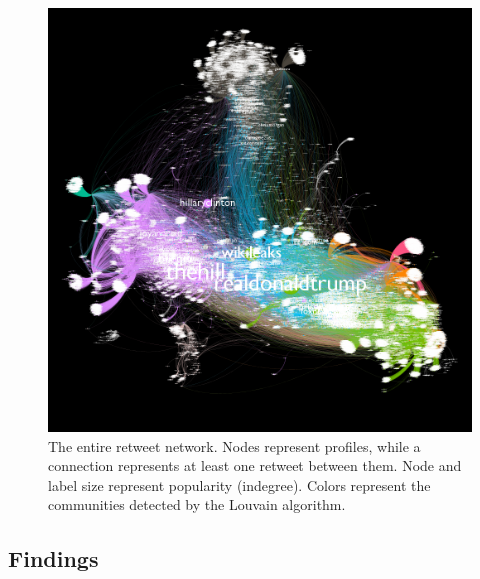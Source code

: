 \documentclass[12pt, titlepage=true, toc=bib]{scrartcl}
\begin{document}
\begin{figure}[!ht]
\centering
\includegraphics[width=0.95\linewidth]{Network_modularity.png}
\caption[Retweet network]{The entire retweet network. Nodes represent profiles, while a connection represents at least one retweet between them. Node and label size represent popularity (indegree). Colors represent the communities detected by the Louvain algorithm.}
\label{fig:graph}
\end{figure}


\subsection{Findings}
\end{document}
